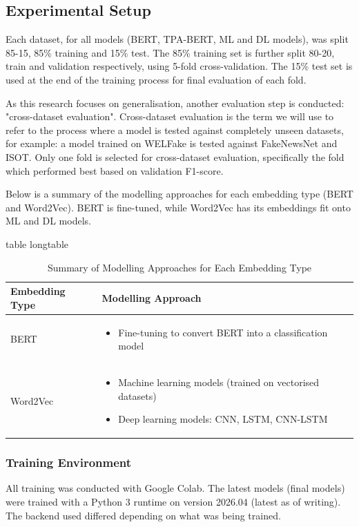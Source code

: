 \documentclass[stu,12pt,floatsintext,donotrepeattitle]{apa7}
\makeatletter
\let\origcaption\caption
\newcommand{\@tabletype}{table}
\newcommand{\@longtabletype}{longtable}
\DeclareRobustCommand{\caption}[2][]{%
    \ifx\relax#1\relax
      \origcaption{#2}%
      \def\temp@cap{#2}%
    \else
      \origcaption[#1]{#2}%
      \def\temp@cap{#1}%
    \fi
    \ifx\@captype\@tabletype
      \ifx\@currenvir\@longtabletype\else
        \addcontentsline{lot}{table}{\protect\numberline{\thetable}{\ignorespaces\temp@cap}}%
      \fi
    \fi
  }%
\let\oldcaption\caption
\renewcommand{\caption}[2][]{%
    \oldcaption[#1]{#2}%
    \vspace{-12pt}%
  }%
\makeatother
\begin{document}
\subsection{Experimental Setup}
Each dataset, for all models (BERT, TPA-BERT, ML and DL models), was split 85-15, 85\% training and 15\% test. The 85\% training set is further split 80-20, train and validation respectively, using 5-fold cross-validation. The 15\% test set is used at the end of the training process for final evaluation of each fold.

As this research focuses on generalisation, another evaluation step is conducted: "cross-dataset evaluation". Cross-dataset evaluation is the term we will use to refer to the process where a model is tested against completely unseen datasets, for example: a model trained on WELFake is tested against FakeNewsNet and ISOT. Only one fold is selected for cross-dataset evaluation, specifically the fold which performed best based on validation F1-score.

Below is a summary of the modelling approaches for each embedding type (BERT and Word2Vec). BERT is fine-tuned, while Word2Vec has its embeddings fit onto ML and DL models.

\vspace{25pt}

\begin{table}[H]
\centering
\caption{Summary of Modelling Approaches for Each Embedding Type}
\label{tab:modelling}
\begin{tabular}{@{}lp{10cm}@{}}
\toprule
\textbf{Embedding Type} & \textbf{Modelling Approach} \\
\midrule
BERT & \begin{itemize}[leftmargin=*, nosep]
    \item Fine-tuning to convert BERT into a classification model 
\end{itemize} \\
\addlinespace
Word2Vec & \begin{itemize}[leftmargin=*, nosep]
    \item Machine learning models (trained on vectorised datasets)
    \item Deep learning models: CNN, LSTM, CNN-LSTM
\end{itemize} \\
\bottomrule
\end{tabular}
\end{table}

\subsubsection{Training Environment}
All training was conducted with Google Colab. The latest models (final models) were trained with a Python 3 runtime on version 2026.04 (latest as of writing). The backend used differed depending on what was being trained.
\end{document}
